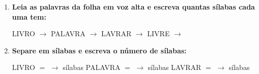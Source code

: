 \begin{exercicio}
\begin{enumerate}[resume]
  \item \textbf{Leia as palavras da folha em voz alta e escreva quantas sílabas cada uma tem:}

  \begin{center}
  LIVRO $\rightarrow$ \underline{\hspace{1cm}} \quad PALAVRA $\rightarrow$ \underline{\hspace{1cm}} \quad LAVRAR $\rightarrow$ \underline{\hspace{1cm}} \quad LIVRE $\rightarrow$ \underline{\hspace{1cm}}
  \end{center}

  \item \textbf{Separe em sílabas e escreva o número de sílabas:}
  \begin{center}
  LIVRO $=$ \underline{\hspace{1.2cm}} $\rightarrow$ \underline{\hspace{0.8cm}} sílabas \quad PALAVRA $=$ \underline{\hspace{1.2cm}} $\rightarrow$ \underline{\hspace{0.8cm}} sílabas \quad LAVRAR $=$ \underline{\hspace{1.2cm}} $\rightarrow$ \underline{\hspace{0.8cm}} sílabas
  \end{center}

\end{enumerate}

\end{exercicio}



